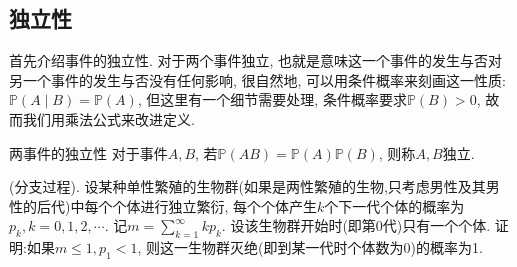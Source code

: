 \subsection{独立性}
首先介绍事件的独立性. 对于两个事件独立, 也就是意味这一个事件的发生与否对另一个事件的发生与否没有任何影响, 很自然地, 
可以用条件概率来刻画这一性质:$\mathbb{P}(A\mid B)=\mathbb{P}(A)$, 但这里有一个细节需要处理, 条件概率要求$\mathbb{P}(B)>0$, 故而我们用乘法公式来改进定义.
\begin{definition}{两事件的独立性}{}
    对于事件$A,B$, 若$\mathbb{P}(AB)=\mathbb{P}(A)\mathbb{P}(B)$, 则称$A,B$独立.
\end{definition}
\begin{example}
    (分支过程). 设某种单性繁殖的生物群(如果是两性繁殖的生物,只考虑男性及其男性的后代)中每个个体进行独立繁衍, 每个个体产生$k$个下一代个体的概率为$p_k,k=0,1,2,\cdots$.
    记$m=\sum_{k=1}^{\infty}kp_k$. 设该生物群开始时(即第0代)只有一个个体. 证明:如果$m\leq 1,p_1<1$, 则这一生物群灭绝(即到某一代时个体数为0)的概率为1.
\end{example}
